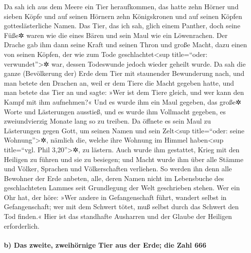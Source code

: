  Da sah ich aus dem Meere ein Tier heraufkommen, das hatte
zehn Hörner und sieben Köpfe und auf seinen Hörnern zehn Königskronen
und auf seinen Köpfen gotteslästerliche Namen.  Das Tier,
das ich sah, glich einem Panther, doch seine Füße✲ waren wie die eines
Bären und sein Maul wie ein Löwenrachen. Der Drache gab ihm dann seine
Kraft und seinen Thron und große Macht,  dazu einen von
seinen Köpfen, der wie zum Tode geschlachtet\textless sup title=``oder:
verwundet''\textgreater✲ war, dessen Todeswunde jedoch wieder geheilt
wurde. Da sah die ganze (Bevölkerung der) Erde dem Tier mit staunender
Bewunderung nach,  und man betete den Drachen an, weil er
dem Tiere die Macht gegeben hatte, und man betete das Tier an und sagte:
»Wer ist dem Tiere gleich, und wer kann den Kampf mit ihm aufnehmen?«
 Und es wurde ihm ein Maul gegeben, das große✲ Worte und
Lästerungen ausstieß, und es wurde ihm Vollmacht gegeben, es
zweiundvierzig Monate lang so zu treiben.  Da öffnete es
sein Maul zu Lästerungen gegen Gott, um seinen Namen und sein
Zelt\textless sup title=``oder: seine Wohnung''\textgreater✲, nämlich
die, welche ihre Wohnung im Himmel haben\textless sup title=``vgl. Phil
3,20''\textgreater✲, zu lästern.  Auch wurde ihm
gestattet, Krieg mit den Heiligen zu führen und sie zu besiegen; und
Macht wurde ihm über alle Stämme und Völker, Sprachen und Völkerschaften
verliehen.  So werden ihn denn alle Bewohner der Erde
anbeten, alle, deren Namen nicht im Lebensbuche des geschlachteten
Lammes seit Grundlegung der Welt geschrieben stehen.  Wer
ein Ohr hat, der höre:  »Wer andere in Gefangenschaft
führt, wandert selbst in Gefangenschaft; wer mit dem Schwert tötet, muß
selbst durch das Schwert den Tod finden.« Hier ist das standhafte
Ausharren und der Glaube der Heiligen erforderlich.

\hypertarget{b-das-zweite-zweihuxf6rnige-tier-aus-der-erde-die-zahl-666}{%
\paragraph{b) Das zweite, zweihörnige Tier aus der Erde; die Zahl
666}\label{b-das-zweite-zweihuxf6rnige-tier-aus-der-erde-die-zahl-666}}

